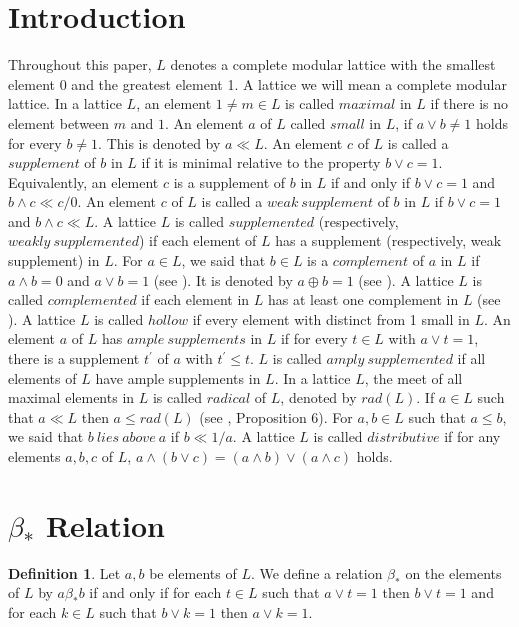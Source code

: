 \documentclass[11pt,reqno]{amsart} %
\theoremstyle{plain}
\theoremstyle{definition}
\newtheorem{definition}{Definition}
\theoremstyle{remark}
\numberwithin{equation}{section}
\begin{document}
\section{Introduction}
Throughout this paper, $ L $ denotes a complete modular lattice with the smallest element 0 and 
the greatest element 1. A lattice we will mean a complete modular lattice. In a lattice $ L $, an element $1 \neq m \in L $ is called $ maximal $ in $ L $ if there is no element between $ m $ and $ 1 $. An element $ a $ of $ L $ 
called $ small $ in $ L $, if $ a \vee b \neq 1 $ holds for every $ b \neq 1 $. This is denoted by $ a \ll L $. An element $ c $ of $ L $ is called a $ supplement $ of $ b $ in $ L $ 
if it is minimal relative to the property $ b \vee c = 1 $. Equivalently, an element $ c $ is a supplement of $ b $ in $ L $ if and only if $ b \vee c = 1 $ and 
$ b \wedge c \ll c/0 $. An element $ c $ of $ L $ is called a $ weak \ supplement $ of $ b $ in $ L $ if $ b \vee c = 1 $ and $ b \wedge c \ll L $. A lattice $ L $ is called 
$ supplemented $ (respectively, $ weakly \ supplemented $) if each element of $ L $ has a supplement (respectively, weak supplement) in $ L $.
For $ a \in L $, we said that $ b \in L $ is a $ complement $ of $ a $ in $ L $ if $ a \wedge b = 0 $ and $ a \vee b = 1 $ (see \cite{davey}). It is denoted by $ a \oplus b = 1 $ (see \cite{calugeranu}). 
A lattice $ L $ is called $ complemented $ if each element in $ L $ has at least one complement in $ L $ (see \cite{calugeranu}). A lattice $ L $ is called $ hollow $ if every element with distinct from 
1 small in $ L $. An element $ a $ of $ L $ has $ ample \  supplements $ in $ L $ if for every $ t \in L $ with  $ a \vee t = 1 $, there is a supplement $ t^{'} $ of $ a $ with $ t^{'} \leq t $. 
$ L $ is called $ amply \ supplemented $ if all elements of $ L $ have ample supplements in $ L $. 
In a lattice $ L $, the meet of all maximal elements in $ L $ is called $ radical $ of $ L $, denoted by $rad(L) $.  
If $ a \in L $ such that $ a \ll L $ then $ a \leq rad(L) $ (see \cite{stenstrom}, Proposition 6). 
For $ a,b \in L $ such that $ a \leq b $, we said that $ b \ lies \ above \ a $ if $ b \ll 1/a $. 
A lattice $ L $ is called $ distributive $ if for any elements $ a,b,c $ of $ L $, $ a \wedge ( b \vee c ) = ( a \wedge b ) \vee ( a \wedge c) $ holds.
\section{$ \beta_* $ Relation}
\begin{definition} \label{1}
  Let $ a,b $ be elements of $ L $. We define a relation $ \beta_* $ on the elements of $ L $ by 
  $ a \beta_* b $ if and only if for each $ t \in L $ such that $ a \vee t = 1 $ then $ b \vee t = 1 $ and for each 
  $ k \in L $ such that $ b \vee k = 1 $ then $ a \vee k = 1 $. 

\end{definition}
\end{document}
